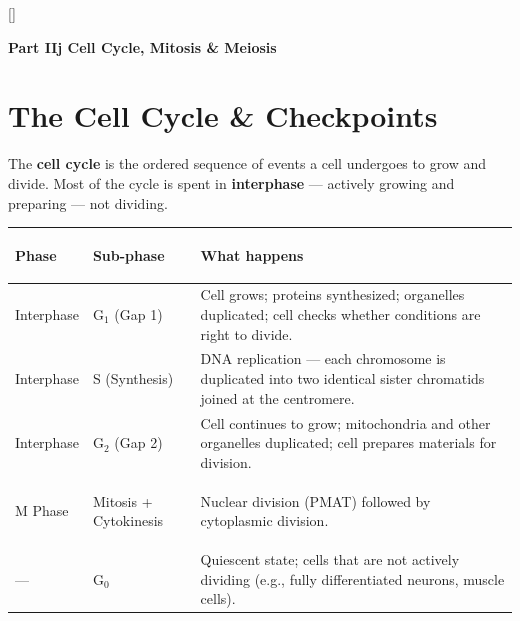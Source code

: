 \documentclass[11pt, letterpaper]{article}
\newcommand{\tealsections}{%
  \titleformat{\section}{\large\bfseries\color{sectionteal}}{}{0em}{}[\color{sectionteal}\titlerule]%
  \titleformat{\subsection}{\normalsize\bfseries\color{sectionteal!80!black}}{}{0em}{}%
}
\newcommand{\partbanner}[3]{%
  \begin{tcolorbox}[colback=#1, colframe=#2, boxrule=1.2pt, arc=4pt,
    left=8pt, right=8pt, top=6pt, bottom=6pt]
    \begin{center}{\LARGE\bfseries #3}\end{center}
  \end{tcolorbox}%
}
\begin{document}
\newpage

\tealsections
{}
\partbanner{part5bg}{sectionteal}{Part IIj \quad Cell Cycle, Mitosis \& Meiosis}

\vspace{8pt}

\section*{The Cell Cycle \& Checkpoints}

The \textbf{cell cycle} is the ordered sequence of events a cell undergoes to grow and
divide. Most of the cycle is spent in \textbf{interphase} --- actively growing and preparing
--- not dividing.

\noindent
{\renewcommand{\arraystretch}{1.6}
\begin{tabularx}{\textwidth}{>{\bfseries\raggedright\arraybackslash}p{2.5cm}
                              >{\bfseries\raggedright\arraybackslash}p{2cm}
                              >{\raggedright\arraybackslash}X}
\toprule
\rowcolor{tableheaderteal}
\textbf{Phase} & \textbf{Sub-phase} & \textbf{What happens} \\
\midrule
\rowcolor{rowTe} Interphase & G$_1$ (Gap 1) & Cell grows; proteins synthesized; organelles duplicated; cell checks whether conditions are right to divide. \\
\rowcolor{rowA}  Interphase & S (Synthesis) & DNA replication --- each chromosome is duplicated into two identical sister chromatids joined at the centromere. \\
\rowcolor{rowTe} Interphase & G$_2$ (Gap 2) & Cell continues to grow; mitochondria and other organelles duplicated; cell prepares materials for division. \\
\rowcolor{rowA}  M Phase    & Mitosis + Cytokinesis & Nuclear division (PMAT) followed by cytoplasmic division. \\
\rowcolor{rowTe} --- & G$_0$ & Quiescent state; cells that are not actively dividing (e.g., fully differentiated neurons, muscle cells). \\
\bottomrule
\end{tabularx}}
\end{document}
